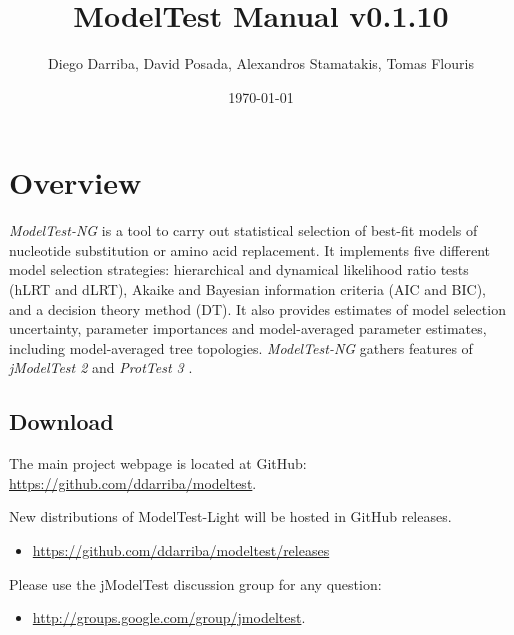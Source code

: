 \documentclass[10pt,twoside,a4paper]{article}
\begin{document}
\providecommand{\versionnumber}{0.1.10}
\title{ModelTest Manual v\versionnumber}
\author{Diego Darriba, David Posada, Alexandros Stamatakis, Tomas Flouris}
\date{\today}
\maketitle

\newcommand{\modeltest}{\emph{ModelTest-NG} }
\newcommand{\modeltestbin}{\emph{modeltest-cmd} }
\newcommand{\modeltestguibin}{\emph{modeltest-gui} }

\setcounter{tocdepth}{2}
\tableofcontents

\clearpage

\section{Overview}

{\modeltest} is a tool to carry out statistical selection of best-fit models of nucleotide substitution or amino acid replacement.
It implements five different model selection strategies: hierarchical and dynamical likelihood ratio tests (hLRT and dLRT), Akaike and Bayesian information criteria (AIC and BIC), and a decision theory method (DT).
It also provides estimates of model selection uncertainty, parameter importances and model-averaged parameter estimates, including model-averaged tree topologies.
{\modeltest} gathers features of {\em jModelTest 2} \citep{Darriba2013} and {\em ProtTest 3} \citep{Darriba2011}.

\subsection{Download}

The main project webpage is located at GitHub: \url{https://github.com/ddarriba/modeltest}.

New distributions of ModelTest-Light will be hosted in GitHub releases.
\begin{itemize}
  \item \url{https://github.com/ddarriba/modeltest/releases}
\end{itemize}

Please use the jModelTest discussion group for any question:
\begin{itemize}
  \item \url{http://groups.google.com/group/jmodeltest}.
\end{itemize}

\end{document}
